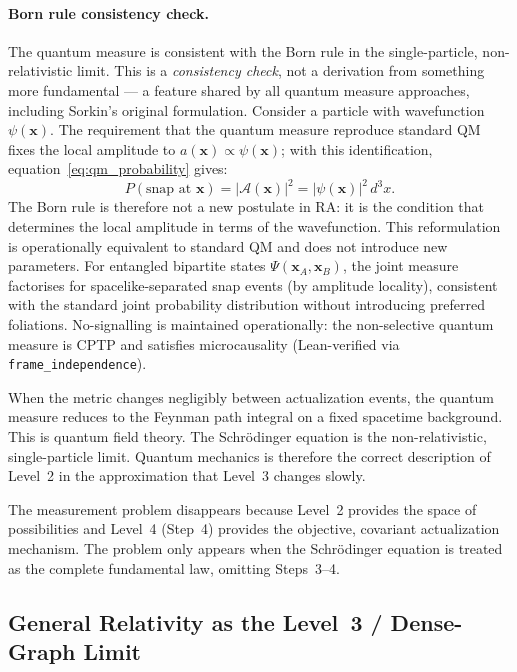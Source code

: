 \documentclass[11pt,a4paper]{article}
\theoremstyle{plain}
\theoremstyle{definition}
\theoremstyle{remark}
\begin{document}
\paragraph{Born rule consistency check.}
The quantum measure is consistent with the Born rule in the single-particle,
non-relativistic limit. This is a \emph{consistency check}, not a derivation
from something more fundamental --- a feature shared by all quantum measure
approaches, including Sorkin's original formulation.
Consider a particle with wavefunction $\psi(\mathbf{x})$. The requirement
that the quantum measure reproduce standard QM fixes the local amplitude
to $a(\mathbf{x}) \propto \psi(\mathbf{x})$; with this identification,
equation~\eqref{eq:qm_probability} gives:
\begin{equation}
  P(\text{snap at } \mathbf{x}) = |\mathcal{A}(\mathbf{x})|^2
  = |\psi(\mathbf{x})|^2\,d^3x.
\end{equation}
The Born rule is therefore not a new postulate in RA: it is the condition
that determines the local amplitude in terms of the wavefunction. This
reformulation is operationally equivalent to standard QM and does not
introduce new parameters.
For entangled bipartite states $\Psi(\mathbf{x}_A, \mathbf{x}_B)$, the joint
measure factorises for spacelike-separated snap events (by amplitude locality),
consistent with the standard joint probability distribution without introducing
preferred foliations. No-signalling is maintained operationally: the
non-selective quantum measure is CPTP and satisfies microcausality
(Lean-verified via \texttt{frame\_independence}).


When the metric changes negligibly between actualization events, the quantum
measure reduces to the Feynman path integral on a fixed spacetime background.
This is quantum field theory. The Schr\"{o}dinger equation is the
non-relativistic, single-particle limit. Quantum mechanics is therefore the
correct description of Level~2 in the approximation that Level~3 changes slowly.

The measurement problem disappears because Level~2 provides the space of
possibilities and Level~4 (Step~4) provides the objective, covariant
actualization mechanism. The problem only appears when the Schr\"{o}dinger
equation is treated as the complete fundamental law, omitting Steps~3--4.

\subsection{General Relativity as the Level~3 / Dense-Graph Limit}
\end{document}
